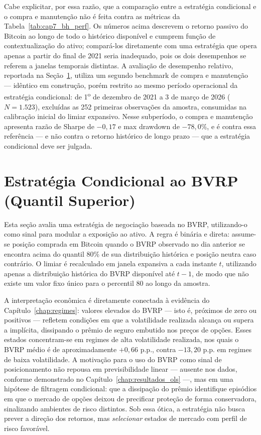 Cabe explicitar, por essa razão, que a comparação entre a estratégia condicional e o compra e manutenção não é feita contra as métricas da Tabela~\ref{tab:cap7_bh_perf}. Os números acima descrevem o retorno passivo do Bitcoin ao longo de todo o histórico disponível e cumprem função de contextualização do ativo; compará-los diretamente com uma estratégia que opera apenas a partir do final de 2021 seria inadequado, pois os dois desempenhos se referem a janelas temporais distintas. A avaliação de desempenho relativo, reportada na Seção~\ref{sec:cap7_bvrp_q}, utiliza um segundo benchmark de compra e manutenção --- idêntico em construção, porém restrito ao mesmo período operacional da estratégia condicional: de 1\textsuperscript{o} de dezembro de 2021 a 3 de março de 2026 ($N = 1.523$), excluídas as 252 primeiras observações da amostra, consumidas na calibração inicial do limiar expansivo. Nesse subperíodo, o compra e manutenção apresenta razão de Sharpe de $-0{,}17$ e max drawdown de $-78{,}0\%$, e é contra essa referência --- e não contra o retorno histórico de longo prazo --- que a estratégia condicional deve ser julgada.

\section{Estratégia Condicional ao BVRP (Quantil Superior)}
\label{sec:cap7_bvrp_q}

Esta seção avalia uma estratégia de negociação baseada no BVRP, utilizando-o como
sinal para modular a exposição ao ativo. A regra é binária e direta: assume-se
posição comprada em Bitcoin quando o BVRP observado no dia anterior se encontra
acima do quantil 80\% de sua distribuição histórica e posição neutra caso contrário.
O limiar é recalculado em janela expansiva a cada instante $t$, utilizando apenas
a distribuição histórica do BVRP disponível até $t-1$, de modo que não existe
um valor fixo único para o percentil 80 ao longo da amostra.

A interpretação econômica é diretamente conectada à evidência do Capítulo~\ref{chap:regimes}: valores elevados do BVRP --- isto é, próximos de zero ou positivos --- refletem condições em que a volatilidade realizada alcança ou supera a implícita, dissipando o prêmio de seguro embutido nos preços de opções. Esses estados concentram-se em regimes de alta volatilidade realizada, nos quais o BVRP médio é de aproximadamente $+0{,}66$ p.p., contra $-13{,}20$ p.p. em regimes de baixa volatilidade. A motivação para o uso do BVRP como sinal de posicionamento não repousa em previsibilidade linear --- ausente nos dados, conforme demonstrado no Capítulo~\ref{chap:resultados_ols} ---, mas em uma hipótese de filtragem condicional: que a dissipação do prêmio identifique episódios em que o mercado de opções deixou de precificar proteção de forma conservadora, sinalizando ambientes de risco distintos. Sob essa ótica, a estratégia não busca prever a direção dos retornos, mas \textit{selecionar} estados de mercado com perfil de risco favorável.

